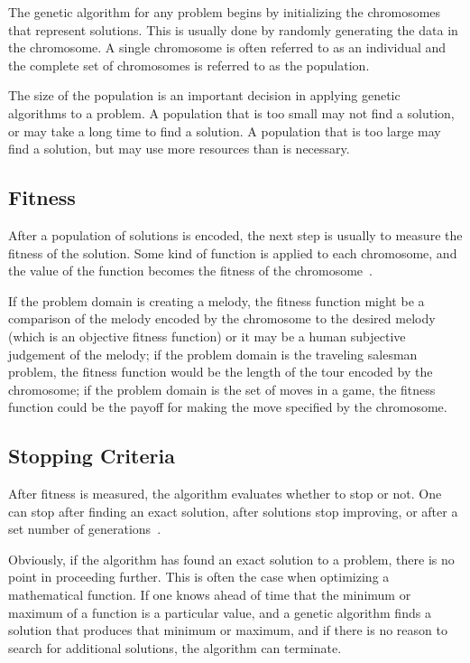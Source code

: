 The genetic algorithm for any problem begins by initializing the chromosomes
that represent solutions. This is usually done by randomly generating the data
in the chromosome. A single chromosome is often referred to as an individual
and the complete set of chromosomes is referred to as the population.

The size of the population is an important decision in applying genetic
algorithms to a problem. A population that is too small may not find a solution,
or may take a long time to find a solution. A population that is too large may
find a solution, but may use more resources than is necessary.

\subsection{Fitness}

After a population of solutions is encoded, the next step is usually to measure
the fitness of the solution. Some kind of function is applied to each
chromosome, and the value of the function becomes the fitness of the 
chromosome~\cite{haupt2004practical}.

If the problem domain is creating a melody, the fitness function might be a
comparison of the melody encoded by the chromosome to the desired melody (which
is an objective fitness function) or it may be a human subjective judgement of
the melody; if the problem domain is the traveling salesman problem, the fitness
function would be the length of the tour encoded by the chromosome; if the
problem domain is the set of moves in a game, the fitness function could be the
payoff for making the move specified by the chromosome.

\subsection{Stopping Criteria}

After fitness is measured, the algorithm evaluates whether to stop or not. One
can stop after finding an exact solution, after solutions stop improving, or
after a set number of generations~\cite{dejong2006evolutionary}.

Obviously, if the algorithm has found an exact solution to a problem, there is
no point in proceeding further. This is often the case when optimizing a
mathematical function. If one knows ahead of time that the minimum or maximum of
a function is a particular value, and a genetic algorithm finds a solution that
produces that minimum or maximum, and if there is no reason to search for
additional solutions, the algorithm can terminate.


